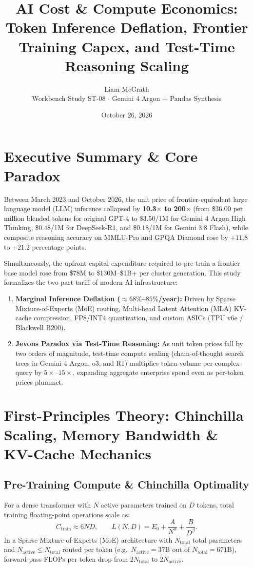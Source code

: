 \documentclass[11pt]{article}
\title{AI Cost \& Compute Economics: Token Inference Deflation, Frontier Training Capex, and Test-Time Reasoning Scaling}
\author{Liam McGrath \\ Workbench Study ST-08 $\cdot$ Gemini 4 Argon + Pandas Synthesis}
\date{October 26, 2026}
\begin{document}
\maketitle
\tableofcontents

\section{Executive Summary \& Core Paradox}
Between March 2023 and October 2026, the unit price of frontier-equivalent large language model (LLM) inference collapsed by \textbf{10.3$\times$ to 200$\times$} (from \$36.00 per million blended tokens for original GPT-4 to \$3.50/1M for Gemini 4 Argon High Thinking, \$0.48/1M for DeepSeek-R1, and \$0.18/1M for Gemini 3.8 Flash), while composite reasoning accuracy on MMLU-Pro and GPQA Diamond rose by $+11.8$ to $+21.2$ percentage points.

Simultaneously, the upfront capital expenditure required to pre-train a frontier base model rose from \$78M to \$130M--\$1B+ per cluster generation. This study formalizes the two-part tariff of modern AI infrastructure:
\begin{enumerate}
  \item \textbf{Marginal Inference Deflation ($\approx 68\%$--$85\%$/year):} Driven by Sparse Mixture-of-Experts (MoE) routing, Multi-head Latent Attention (MLA) KV-cache compression, FP8/INT4 quantization, and custom ASICs (TPU v6e / Blackwell B200).
  \item \textbf{Jevons Paradox via Test-Time Reasoning:} As unit token prices fall by two orders of magnitude, test-time compute scaling (chain-of-thought search trees in Gemini 4 Argon, o3, and R1) multiplies token volume per complex query by $5\times$--$15\times$, expanding aggregate enterprise spend even as per-token prices plummet.
\end{enumerate}

\section{First-Principles Theory: Chinchilla Scaling, Memory Bandwidth \& KV-Cache Mechanics}

\subsection{Pre-Training Compute \& Chinchilla Optimality}
For a dense transformer with $N$ active parameters trained on $D$ tokens, total training floating-point operations scale as:
\begin{equation}
  C_{\text{train}} \approx 6 N D, \qquad L(N, D) = E_0 + \frac{A}{N^{\alpha}} + \frac{B}{D^{\beta}}.
  \label{eq:chinchilla}
\end{equation}
In a Sparse Mixture-of-Experts (MoE) architecture with $N_{\text{total}}$ total parameters and $N_{\text{active}} \leq N_{\text{total}}$ routed per token (e.g.\ $N_{\text{active}} = 37\text{B}$ out of $N_{\text{total}} = 671\text{B}$), forward-pass FLOPs per token drop from $2 N_{\text{total}}$ to $2 N_{\text{active}}$.
\end{document}
